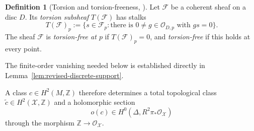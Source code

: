 \documentclass[11pt]{amsart}
\numberwithin{equation}{section}
\theoremstyle{plain}
\theoremstyle{definition}
\newtheorem{defn}[thm]{Definition}
\newcommand{\Z}{\mathbb Z}
\newcommand{\cF}{\mathcal F}
\newcommand{\cO}{\mathcal O}
\newcommand{\cX}{\mathcal X}
\begin{document}
\begin{defn}[Torsion and torsion-freeness, {\cite[\S~7.5]{Re94}}]
\label{def:revised-torsion-sheaf}
Let $\cF$ be a coherent sheaf on a disc $D$.  Its \emph{torsion
subsheaf} $T(\cF)$ has stalks
\begin{equation*}
 T(\cF)_p:=\{s\in\cF_p:\text{there is }0\ne g\in\cO_{D,p}
                         \text{ with }gs=0\}.
\end{equation*}
The sheaf $\cF$ is \emph{torsion-free at $p$} if $T(\cF)_p=0$,
and \emph{torsion-free} if this holds at every point.
\end{defn}

The finite-order vanishing needed below is established directly in
Lemma~\ref{lem:revised-discrete-support}.

A class $c\in H^2(M,\Z)$ therefore determines a total
topological class $\widetilde c\in H^2(\cX,\Z)$ and a holomorphic section
\begin{equation*}
 o(c)\in H^0\!\left(\Delta,R^2\pi_*\cO_{\cX}\right)
\end{equation*}
through the morphism $\Z\to\cO_{\cX}$.
\end{document}
